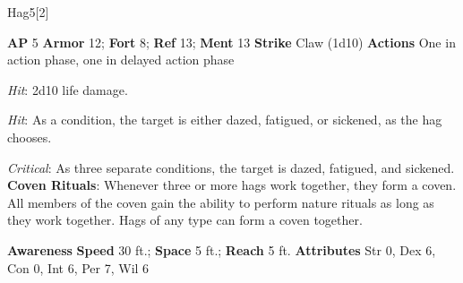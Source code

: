 \begin{monsection}[Green]{Hag}{5}[2]
\vspace{-1em}\vspace{-1em}
\begin{spellcontent}
\begin{spelltargetinginfo}
{\textbf{AP} 5}
\pari \textbf{Armor} 12;
\textbf{Fort} 8;
\textbf{Ref} 13;
\textbf{Ment} 13
\pari \textbf{Strike} Claw  (1d10)
\pari \textbf{Actions} One in action phase, one in delayed action phase
\end{spelltargetinginfo}
\begin{spelleffects}
\pari
{}
\par
\par \textit{Hit}: 2d10 life damage.
\vspace{0.5em}
\pari
{}
\par
\par \textit{Hit}:
As a condition, the target is either dazed, fatigued, or sickened, as the hag chooses.
\par \textit{Critical}: As three separate conditions, the target is dazed, fatigued, and sickened.
\vspace{0.5em}
\pari
\textbf{Coven Rituals}:
Whenever three or more hags work together, they form a coven.
All members of the coven gain the ability to perform nature rituals as long as they work together.
Hags of any type can form a coven together.
\end{spelleffects}
\end{spellcontent}
\begin{spellsubcontent}
\begin{spellfooter}
\pari \textbf{Awareness} 
\pari \textbf{Speed} 30 ft.;
\textbf{Space} 5 ft.;
\textbf{Reach} 5 ft.
\pari \textbf{Attributes}
Str 0,
Dex 6,
Con 0,
Int 6,
Per 7,
Wil 6
\end{spellfooter}
\end{spellsubcontent}
\end{monsection}
